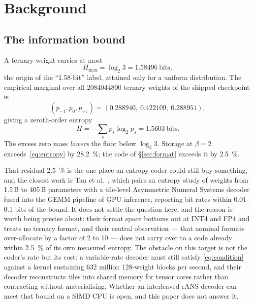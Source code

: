 \documentclass[11pt,a4paper]{article}
\begin{document}
\section{Background}

\subsection{The information bound}
A ternary weight carries at most
\begin{equation}
H_{\max}=\log_{2}3=\num{1.58496}\ \text{bits},
\end{equation}
the origin of the ``1.58-bit'' label, attained only for a uniform distribution.
The empirical marginal over all \num{2084044800} ternary weights of the shipped
checkpoint is
\begin{equation}
(p_{-1},p_{0},p_{+1})=(\num{0.288940},\ \num{0.422109},\ \num{0.288951}),
\end{equation}
giving a zeroth-order entropy
\begin{equation}
H=-\sum_{s}p_{s}\log_{2}p_{s}=\num{1.5603}\ \text{bits}.
\label{eq:entropy}
\end{equation}
The excess zero mass \emph{lowers} the floor below $\log_{2}3$. Storage at
$\beta=2$ exceeds~\eqref{eq:entropy} by \SI{28.2}{\percent}; the code of
\S\ref{sec:format} exceeds it by \SI{2.5}{\percent}.

That residual \SI{2.5}{\percent} is the one place an entropy coder could still
buy something, and the closest work is Tan et al.~\cite{shannonllm}, which pairs
an entropy study of weights from 1.5\,B to 405\,B parameters with a tile-level
Asymmetric Numeral Systems decoder fused into the GEMM pipeline of GPU
inference, reporting bit rates within \numrange{0.01}{0.1} bits of the bound.
It does not settle the question here, and the reason is worth being precise
about: their format space bottoms out at INT4 and FP4 and treats no ternary
format, and their central observation --- that nominal formats over-allocate by
a factor of 2 to 10 --- does not carry over to a code already within
\SI{2.5}{\percent} of its own measured entropy. The obstacle on this target is
not the coder's rate but its cost: a variable-rate decoder must still satisfy
\eqref{eq:condition} against a kernel sustaining \num{632} million
128-weight blocks per second, and their decoder
reconstructs tiles into shared memory for tensor cores rather than contracting
without materialising. Whether an interleaved rANS decoder can meet that bound
on a SIMD CPU is open, and this paper does not answer it.
\end{document}
